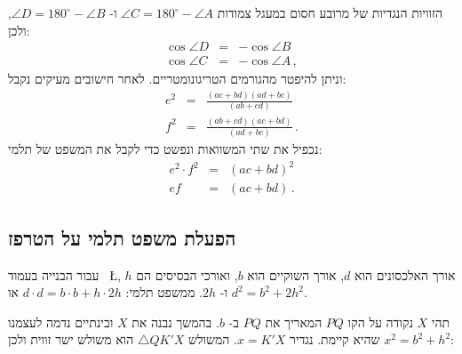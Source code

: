 הזוויות הנגדיות של מרובע חסום במעגל צמודות
$\angle C = 180^\circ - \angle A$
ו-%
$\angle D = 180^\circ - \angle B$,
ולכן:
\begin{eqnarray*}
\cos \angle D &=& - \cos \angle B\\
\cos \angle C &=& -\cos \angle A\,,
\end{eqnarray*}
וניתן להיפטר מהגורמים הטריגונומטריים. לאחר חישובים מעיקים נקבל:
\begin{eqnarray*}
e^2 &=& \frac{(ac+bd)(ad+bc)}{(ab+cd)}\\
f^2 &=& \frac{(ab+cd)(ac+bd)}{(ad+bc)}\,.
\end{eqnarray*}
נכפיל את שתי המשוואות ונפשט כדי לקבל את המשפט של תלמי:
\begin{eqnarray*}
e^2\cdot f^2 &=& (ac+bd)^2\\
ef &=& (ac+bd)\,. 
\end{eqnarray*}

\vspace{-8ex}

\subsection*{הפעלת משפט תלמי על הטרפז}

עבור הבנייה בעמוד~%
\L{\pageref{p.ptolemy}},
אורך האלכסונים הוא
$d$,
אורך השוקיים הוא
$b$,
ואורכי הבסיסים הם
$h$
ו-%
$2h$.
ממשפט תלמי:
$d\cdot d = b\cdot b + h\cdot 2h$
או
$d^2=b^2+2h^2$.

תהי
$X$
נקודה על הקו
$PQ$
המאריך את
$PQ$
ב-%
$b$.
בהמשך נבנה את 
$X$
ובינתיים נדמה לעצמנו שהיא קיימת. נגדיר 
$x = K'X$.
המשולש
$\triangle QK'X$
הוא משולש ישר זווית ולכן
$x^2 = b^2 + h^2$:


